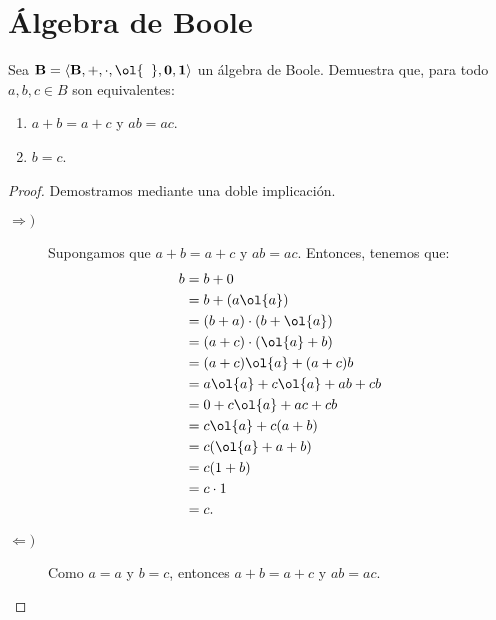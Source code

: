 \section{Álgebra de Boole}

\begin{ejercicio}
    Sea $\bf{B}=\langle B,+,\cdot,\ol{\phantom{a}}, 0,1\rangle$ un álgebra de Boole. Demuestra que,
    para todo $a,b,c\in B$ son equivalentes:
    \begin{enumerate}
        \item $a+b=a+c$ y $ab=ac$.
        \item $b=c$.
    \end{enumerate}
    \begin{proof}
        Demostramos mediante una doble implicación.
        \begin{description}
            \item[$\Longrightarrow)$]
            
            Supongamos que $a+b=a+c$ y $ab=ac$. Entonces, tenemos que:
            \begin{align*}
                b &= b + 0\\
                &= b + (a\ol{a})\\
                &= (b+a) \cdot (b+\ol{a})\\
                &= (a+c) \cdot (\ol{a}+b)\\
                &= (a+c)\ol{a} + (a+c)b\\
                &= a\ol{a} + c\ol{a} + ab + cb\\
                &= 0 + c\ol{a} + ac + cb\\
                &= c\ol{a} + c(a+b)\\
                &= c(\ol{a} + a + b)\\
                &= c(1+b)\\
                &= c\cdot 1\\
                &= c.
            \end{align*}

            \item[$\Longleftarrow)$]
            
            Como $a=a$ y $b=c$, entonces $a+b=a+c$ y $ab=ac$.
        \end{description}
    \end{proof}
\end{ejercicio}


